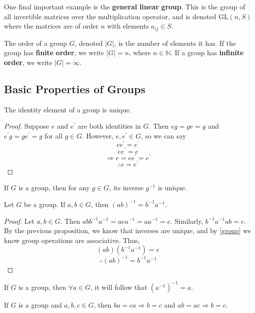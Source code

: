 \documentclass[12pt, letterpaper]{report}
\begin{document}
One final important example is the \textbf{general} \textbf{linear} \textbf{group}. This is the group of all invertible matrices over the multiplication operator, and is denoted \(\text{GL}(n,S) \) where the matrices are of order \(n\) with elements \(a_{ij} \in S\).
\begin{definition}
	The order of a group \(G\), denoted \(|G|\), is the number of elements it has. If the group has \textbf{finite} \textbf{order}, we write \(|G| =n\), where \(n\in\mathbb{N} \). If a group has \textbf{infinite} \textbf{order}, we write \(|G| =\infty\).
\end{definition}
\subsection*{Basic Properties of Groups}
\begin{proposition}
	The identity element of a group is unique. 
\end{proposition}
\begin{proof}
	Suppose \(e\) and \(e^{\prime} \) are both identities in \(G\). Then \(eg=ge=g\) and \(e^{\prime} g=ge^{\prime} =g\) for all \(g\in G\). However, \(e,e^{\prime} \in G\), so we can say
	\[
		ee^{\prime} =e^{\prime} 
	\]
	\[
		ee^{\prime} =e
	\]
	\[
		\Longrightarrow e=ee^{\prime}=e^{\prime} 
	\]
	\[
		\therefore e=e^{\prime} 
	\]
\end{proof}
\begin{proposition}
	If \(G\) is a group, then for any \(g\in G\), its inverse \(g^{-1} \) is unique.
\end{proposition}
\begin{proposition}
	Let \(G\) be a group. If \(a,b\in G\), then \((ab)^{-1} =b^{-1} a^{-1} \).
\end{proposition}
\begin{proof}
	Let \(a,b\in G\). Then \(abb^{-1} a^{-1} =aea^{-1} =aa^{-1} =e\). Similarly, \(b^{-1} a^{-1} ab=e\). By the previous proposition, we know that inverses are unique, and by \ref{group} we know group operations are associative. Thus,
	\[
		(ab)\left( b^{-1} a^{-1}  \right) =e
	\]
	\[
		\therefore (ab)^{-1} =b^{-1} a^{-1} 
	\]
\end{proof}
\begin{proposition}
	If \(G\) is a group, then \(\forall a\in G\), it will follow that \(\left( a^{-1}  \right)^{-1} =a \).
\end{proposition}
\begin{proposition}
	If \(G\) is a group and \(a,b,c\in G\), then \(ba=ca\Longrightarrow b=c\) and \(ab=ac\Longrightarrow b=c\).
\end{proposition}
\end{document}
